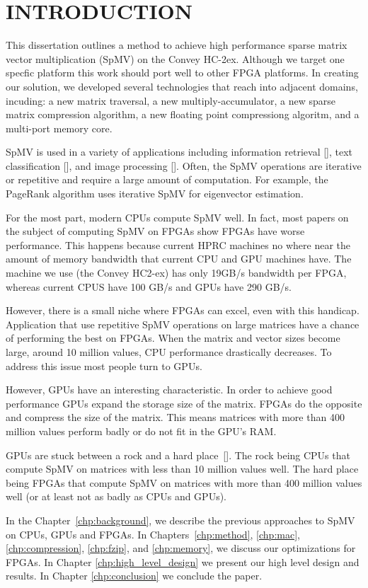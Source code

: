 \chapter{INTRODUCTION}
\label{chp:introduction}
This dissertation outlines a method to achieve high performance sparse matrix vector multiplication (SpMV) on the Convey HC-2ex. Although we target one specfic platform this work should port well to other FPGA platforms. In creating our solution, we developed several technologies that reach into adjacent domains, incuding: a new matrix traversal, a new multiply-accumulator, a new sparse matrix compression algorithm, a new floating point compressiong algoritm, and a multi-port memory core.

\par SpMV is used in a variety of applications including information retrieval [\cite{prelim:page}], text classification [\cite{prelim:townsend2}], and image processing [\cite{prelim:wang}]. Often, the SpMV operations are iterative or repetitive and require a large amount of computation. For example, the PageRank algorithm uses iterative SpMV for eigenvector estimation.

\par For the most part, modern CPUs compute SpMV well. In fact, most papers on the subject of computing SpMV on FPGAs show FPGAs have worse performance. This happens because current HPRC machines no where near the amount of memory bandwidth that current CPU and GPU machines have. The machine we use (the Convey HC2-ex) has only 19GB/s bandwidth per FPGA, whereas current CPUS have 100 GB/s and GPUs have 290 GB/s.

However, there is a small niche where FPGAs can excel, even with this handicap. Application that use repetitive SpMV operations on large matrices have a chance of performing the best on FPGAs. When the matrix and vector sizes  become large, around 10 million values, CPU performance drastically decreases. To address this issue most people turn to GPUs.
\par However, GPUs have an interesting characteristic. In order to achieve good performance GPUs expand the storage size of the matrix. FPGAs do the opposite and compress the size of the matrix. This means matrices with more than 400 million values perform badly or do not fit in the GPU's RAM.
\par GPUs are stuck between a rock and a hard place~[\cite{prelim:davis0}]. The rock being CPUs that compute SpMV on matrices with less than 10 million values well. The hard place being FPGAs that compute SpMV on matrices with more than 400 million values well (or at least not as badly as CPUs and GPUs).
\par In the Chapter~\ref{chp:background}, we describe the previous approaches to SpMV on CPUs, GPUs and FPGAs. In Chapters~\ref{chp:method}, \ref{chp:mac}, \ref{chp:compression}, \ref{chp:fzip}, and \ref{chp:memory}, we discuss our optimizations for FPGAs. In Chapter \ref{chp:high_level_design} we present our high level design and results. In Chapter \ref{chp:conclusion} we conclude the paper.
